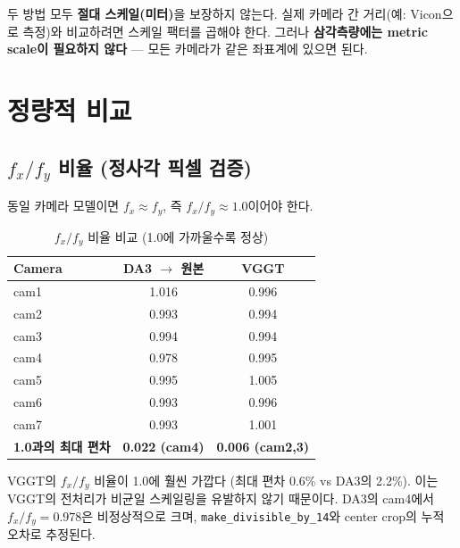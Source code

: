 \documentclass[11pt, a4paper]{report}
\begin{document}
\begin{warningbox}
두 방법 모두 \textbf{절대 스케일(미터)}을 보장하지 않는다. 실제 카메라 간 거리(예: Vicon으로 측정)와 비교하려면 스케일 팩터를 곱해야 한다. 그러나 \textbf{삼각측량에는 metric scale이 필요하지 않다} --- 모든 카메라가 같은 좌표계에 있으면 된다.
\end{warningbox}


\chapter{정량적 비교}

\section{$f_x/f_y$ 비율 (정사각 픽셀 검증)}

동일 카메라 모델이면 $f_x \approx f_y$, 즉 $f_x/f_y \approx 1.0$이어야 한다.

\begin{table}[H]
\centering
\caption{$f_x/f_y$ 비율 비교 (1.0에 가까울수록 정상)}
\renewcommand{\arraystretch}{1.3}
\begin{tabular}{l cc}
\toprule
\textbf{Camera} & \textbf{DA3 $\rightarrow$ 원본} & \textbf{VGGT} \\
\midrule
cam1 & 1.016 & 0.996 \\
cam2 & 0.993 & 0.994 \\
cam3 & 0.994 & 0.994 \\
cam4 & 0.978 & 0.995 \\
cam5 & 0.995 & 1.005 \\
cam6 & 0.993 & 0.996 \\
cam7 & 0.993 & 1.001 \\
\midrule
\textbf{1.0과의 최대 편차} & \textbf{0.022 (cam4)} & \textbf{0.006 (cam2,3)} \\
\bottomrule
\end{tabular}
\end{table}

\begin{summary}
VGGT의 $f_x/f_y$ 비율이 1.0에 훨씬 가깝다 (최대 편차 0.6\% vs DA3의 2.2\%).
이는 VGGT의 전처리가 비균일 스케일링을 유발하지 않기 때문이다.
DA3의 cam4에서 $f_x/f_y = 0.978$은 비정상적으로 크며, \texttt{make\_divisible\_by\_14}와 center crop의 누적 오차로 추정된다.
\end{summary}
\end{document}
